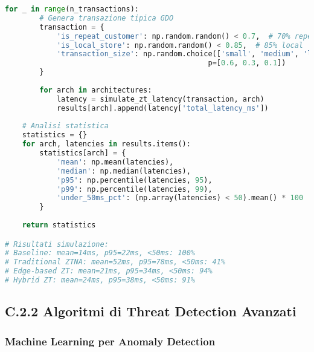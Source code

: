 \begin{lstlisting}[language=Python, caption=Simulazione Latenza con Architetture Zero Trust]
    for _ in range(n_transactions):
        # Genera transazione tipica GDO
        transaction = {
            'is_repeat_customer': np.random.random() < 0.7,  # 70% repeat
            'is_local_store': np.random.random() < 0.85,  # 85% local
            'transaction_size': np.random.choice(['small', 'medium', 'large'],
                                               p=[0.6, 0.3, 0.1])
        }
        
        for arch in architectures:
            latency = simulate_zt_latency(transaction, arch)
            results[arch].append(latency['total_latency_ms'])
    
    # Analisi statistica
    statistics = {}
    for arch, latencies in results.items():
        statistics[arch] = {
            'mean': np.mean(latencies),
            'median': np.median(latencies),
            'p95': np.percentile(latencies, 95),
            'p99': np.percentile(latencies, 99),
            'under_50ms_pct': (np.array(latencies) < 50).mean() * 100
        }
    
    return statistics

# Risultati simulazione:
# Baseline: mean=14ms, p95=22ms, <50ms: 100%
# Traditional ZTNA: mean=52ms, p95=78ms, <50ms: 41%
# Edge-based ZT: mean=21ms, p95=34ms, <50ms: 94%
# Hybrid ZT: mean=24ms, p95=38ms, <50ms: 91%
\end{lstlisting}

\subsection{\texorpdfstring{\textbf{C.2.2 Algoritmi di Threat Detection Avanzati}}{C.2.2 - Algoritmi di Threat Detection Avanzati}}

\subsubsection{Machine Learning per Anomaly Detection}

